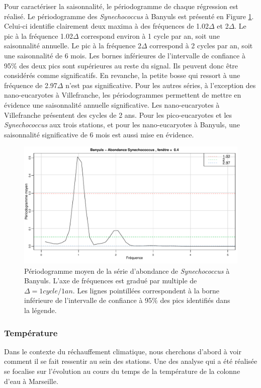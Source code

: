 \documentclass[12pt]{article}
\begin{document}
Pour caractériser la saisonnalité, le périodogramme de chaque régression est réalisé. Le périodogramme des \textit{Synechococcus} à Banyuls est présenté en Figure \ref{period}. Celui-ci identifie clairement deux maxima à des fréquences de 1.02$\Delta$ et 2$\Delta$. Le pic à la fréquence 1.02$\Delta$ correspond environ à 1 cycle par an, soit une saisonnalité annuelle. Le pic à la fréquence 2$\Delta$ correspond à 2 cycles par an, soit une saisonnalité de 6 mois. Les bornes inférieures de l’intervalle de confiance à 95\% des deux pics sont supérieures au reste du signal. Ils peuvent donc être considérés comme significatifs. En revanche, la petite bosse qui ressort à une fréquence de 2.97$\Delta$ n’est pas significative. Pour les autres séries, à l’exception des nano-eucaryotes à Villefranche, les périodogrammes permettent de mettre en évidence une saisonnalité annuelle significative. Les nano-eucaryotes à Villefranche présentent des cycles de 2 ans. Pour les pico-eucaryotes et les \textit{Synechococcus} aux trois stations, et pour les nano-eucaryotes à Banyuls, une saisonnalité significative de 6 mois est aussi mise en évidence.  

\begin{figure}
\centering
\includegraphics[width=.7\textwidth]{fig/R12_period_syn_banyuls.pdf}
\caption{Périodogramme moyen de la série d'abon\-dance de \textit{Synechococcus} à Banyuls. L'axe de fréquences est gradué par multiple de $\Delta=1 cycle/1 an$. Les lignes pointillées correspondent à la borne inférieure de l'intervalle de confiance à 95\% des pics identifiés dans la légende.}
\label{period}
\end{figure}


\subsubsection{Température}

Dans le contexte du réchauffement climatique, nous cherchons d’abord à voir comment il se fait ressentir au sein des stations. Une des analyse qui a été réalisée se focalise sur l'évolution au cours du temps de la température de la colonne d'eau à Marseille. 
\end{document}
